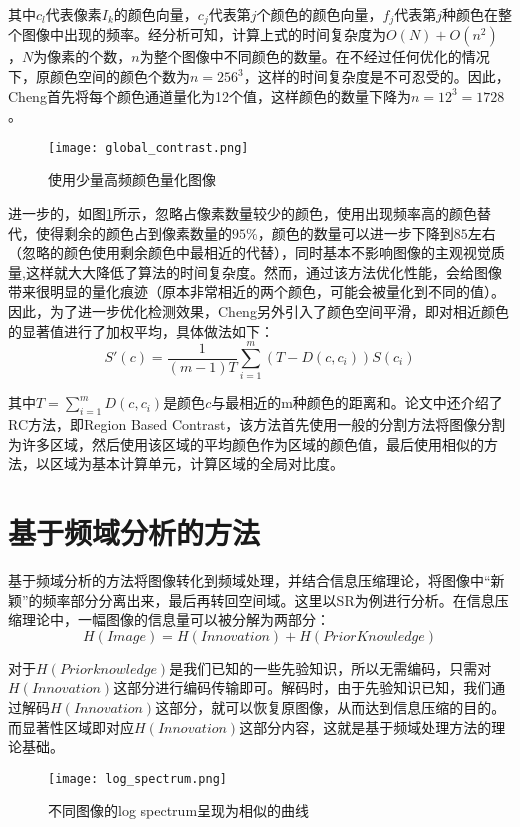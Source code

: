 其中$c_l$代表像素$I_k$的颜色向量，$c_j$代表第$j$个颜色的颜色向量，$f_j$代表第$j$种颜色在整个图像中出现的频率。经分析可知，计算上式的时间复杂度为$O(N)+O(n^2)$，$N$为像素的个数，$n$为整个图像中不同颜色的数量。在不经过任何优化的情况下，原颜色空间的颜色个数为$n=256^3$，这样的时间复杂度是不可忍受的。因此，Cheng首先将每个颜色通道量化为12个值，这样颜色的数量下降为$n=12^3=1728$。
\begin{figure}
\centering
\texttt{[image: global\_contrast.png]}
\caption{使用少量高频颜色量化图像}\label{fig:global_contrast}
\end{figure}
进一步的，如图\ref{fig:global_contrast}所示，忽略占像素数量较少的颜色，使用出现频率高的颜色替代，使得剩余的颜色占到像素数量的$95\%$，颜色的数量可以进一步下降到$85$左右（忽略的颜色使用剩余颜色中最相近的代替），同时基本不影响图像的主观视觉质量\cite{cheng2011global},这样就大大降低了算法的时间复杂度。然而，通过该方法优化性能，会给图像带来很明显的量化痕迹（原本非常相近的两个颜色，可能会被量化到不同的值）。因此，为了进一步优化检测效果，Cheng另外引入了颜色空间平滑，即对相近颜色的显著值进行了加权平均，具体做法如下：
\begin{equation}
S'(c) = \frac{1}{(m-1)T}\sum_{i=1}^{m}(T-D(c,c_i))S(c_i)
\end{equation}

其中$T=\sum_{i=1}^m D(c,c_i)$是颜色$c$与最相近的m种颜色的距离和。论文中还介绍了RC方法，即Region Based Contrast，该方法首先使用一般的分割方法将图像分割为许多区域，然后使用该区域的平均颜色作为区域的颜色值，最后使用相似的方法，以区域为基本计算单元，计算区域的全局对比度。

\section{基于频域分析的方法}
基于频域分析的方法将图像转化到频域处理，并结合信息压缩理论，将图像中“新颖”的频率部分分离出来，最后再转回空间域。这里以SR\cite{hou2007saliency}为例进行分析。在信息压缩理论中，一幅图像的信息量可以被分解为两部分：
\begin{equation}
H(Image)=H(Innovation)+H(Prior Knowledge)
\end{equation}

对于$H(Prior knowledge)$是我们已知的一些先验知识，所以无需编码，只需对$H(Innovation)$这部分进行编码传输即可。解码时，由于先验知识已知，我们通过解码$H(Innovation)$这部分，就可以恢复原图像，从而达到信息压缩的目的。而显著性区域即对应$H(Innovation)$这部分内容，这就是基于频域处理方法的理论基础。

\begin{figure}[h]
\centering
\texttt{[image: log\_spectrum.png]}
\caption{不同图像的log spectrum呈现为相似的曲线}\label{fig:log_spectrum}
\end{figure}

